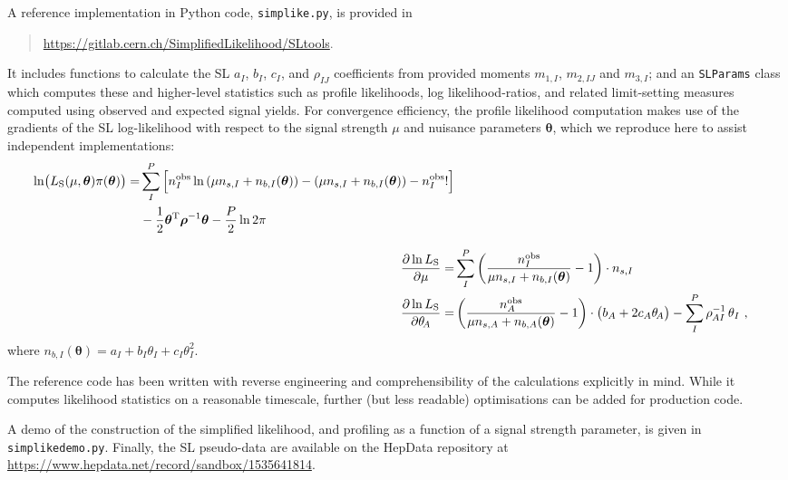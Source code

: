 \documentclass[11pt]{article}
\begin{document}
A reference implementation in Python code, {\tt simplike.py}, is provided in
\begin{quote}
  \url{https://gitlab.cern.ch/SimplifiedLikelihood/SLtools}. 
\end{quote}
It includes functions to
calculate the SL $a_I$, $b_I$, $c_I$, and $\rho_{IJ}$ coefficients from provided
moments $m_{1,I}$, $m_{2,IJ}$ and $m_{3,I}$; and an \texttt{SLParams} class
which computes these and higher-level statistics such as profile likelihoods,
log likelihood-ratios, and related limit-setting measures computed using
observed and expected signal yields. For convergence efficiency, the profile
likelihood computation makes use of the gradients of the SL log-likelihood with
respect to the signal strength $\mu$ and nuisance parameters $\bm{\theta}$,
which we reproduce here to assist independent implementations:
%
\begin{align}
  \begin{split}
    \ln\! \big( L_{\rm{S}}(\mu,\bm{\theta} )\pi(\bm{\theta}) \big) =&
    \sum_I^P \Big[ n^{\rm{obs}}_{I} \ln \left(\mu n_{s,I} + n_{b,I}({\bm \theta}) \right) - \left( \mu n_{s,I} + n_{b,I}({\bm \theta}) \right) - n^{\rm{obs}}_{I}! \Big]\\
    &- \frac{1}{2} \bm{\theta}^\mathrm{T} \bm{\rho}^{-1} \bm{\theta} - \frac{P}{2} \ln 2\pi
  \end{split}\\[2ex]
  \frac{\partial\ln L_{\rm{S}}}{\partial\mu} =& \sum_I^P \left( \frac{n^{\rm{obs}}_I}{\mu n_{s,I} + n_{b,I}(\bm{\theta})} - 1 \right) \cdot n_{s,I} \\
  \frac{\partial\ln L_{\rm{S}}}{\partial\theta_{\!A}} =& \left( \frac{n^{\rm{obs}}_A}{\mu n_{s,A} + n_{b,A}({\bm \theta}) } - 1 \right) \cdot \big( b_A + 2 c_A \theta_{\!A} \big) - \sum_I^P \rho_{\mspace{-1mu}AI}^{-1} \, \theta_I ~,
\label{eq:SL_LHC_refcode}
\end{align}
%
where $n_{b,I}({\bm\theta}) = a_{I} + b_{I}\theta_{I} + c_{I}\theta_{I}^{2}$.

The reference code has been written with reverse engineering and
comprehensibility of the calculations explicitly in mind. While it computes
likelihood statistics on a reasonable timescale, further (but less readable)
optimisations can be added for production code.

A demo of the construction of the simplified likelihood, and profiling as a function of a signal strength parameter, is given in {\tt simplikedemo.py}.
Finally, the SL pseudo-data are available on the HepData repository at \url{https://www.hepdata.net/record/sandbox/1535641814}.




\end{document}
